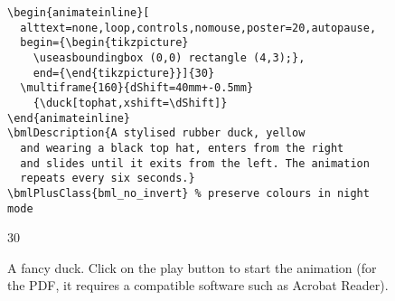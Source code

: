 \documentclass[a4paper,british]{article}
\begin{document}
\begin{figure}
  \begin{lstlisting}[style=bookml]
\begin{animateinline}[
  alttext=none,loop,controls,nomouse,poster=20,autopause,
  begin={\begin{tikzpicture}
    \useasboundingbox (0,0) rectangle (4,3);},
    end={\end{tikzpicture}}]{30}
  \multiframe{160}{dShift=40mm+-0.5mm}
    {\duck[tophat,xshift=\dShift]}
\end{animateinline}
\bmlDescription{A stylised rubber duck, yellow
  and wearing a black top hat, enters from the right
  and slides until it exits from the left. The animation
  repeats every six seconds.}
\bmlPlusClass{bml_no_invert} % preserve colours in night mode
  \end{lstlisting}
  \begin{center}
    \begin{animateinline}[
      alttext=none,loop,controls,nomouse,poster=20,autopause,
      poster=20,autopause,
      begin={\begin{tikzpicture}%
        \useasboundingbox (0,0) rectangle (4,3);},
        end={\end{tikzpicture}}]{30}
        {\duck[tophat,xshift=\dShift]}
    \end{animateinline}
  \end{center}
  \caption{A fancy duck. Click on the play button to start the animation (for the PDF, it requires a compatible software such as Acrobat Reader).}
  \label{fig:duck}
\end{figure}
\end{document}
